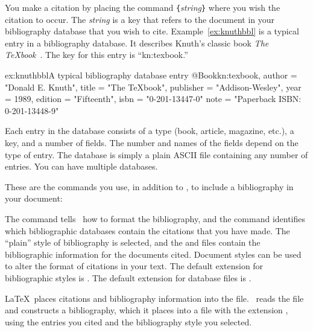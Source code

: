 You make a citation by placing the command 
\verb|{|\textit{string}\verb|}|
where you wish the citation to occur.  The {\it string\/} is a
key that refers to the document in your bibliography database that
you wish to cite.  Example~\ref{ex:knuthbbl} is a
typical entry in a bibliography database.  It 
describes Knuth's classic 
book {\it The \TeX{}book}~\cite{kn:texbook}.  The key for this
entry is ``kn:texbook.''

\begin{example}{ex:knuthbbl}{A typical bibliography database entry}
@Book{kn:texbook,
  author    = "Donald E. Knuth",
  title     = "The {\TeX}book",
  publisher = "Addison-Wesley",
  year      = 1989,
  edition   = "Fifteenth",
  isbn      = "0-201-13447-0"
  note      = "Paperback ISBN: 0-201-13448-9"
}
\end{example}

Each entry in the database consists of a type (book, article, magazine, etc.),
a key, and a number of fields.  The number and names of the fields depend
on the type of entry.  The database is simply a plain ASCII file containing
any number of entries.  You can have multiple databases.

These are the commands you use, in addition to
, to include a bibliography in your document:

\begin{shortexample}
%


\end{shortexample}

The  command tells \BibTeX\ how to format the
bibliography, and the  command identifies which
bibliographic databases contain the citations that you have made.  The
``plain'' style of bibliography is selected, and the
 and  files contain the
bibliographic information for the documents cited.  Document styles
can be used to alter the format of citations in your text.
The default extension for bibliographic 
styles is . The 
default extension 
for database files is . 
\goodbreak

\LaTeX\ places citations and bibliography information into 
the  file.  \BibTeX\ 
reads the  file 
and constructs a bibliography,
which it places into a file with the 
extension , using the
entries you cited and the bibliography style you selected.

